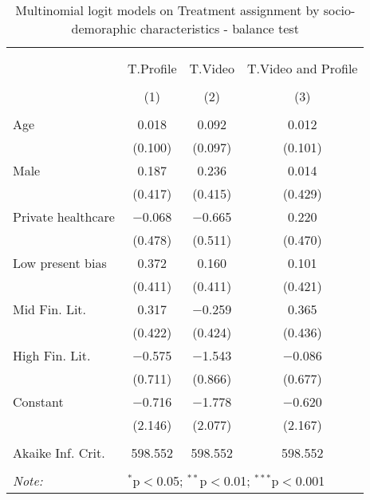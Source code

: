 
\begin{table}[H] \centering 
  \caption{Multinomial logit models on Treatment assignment by socio-demoraphic characteristics  - balance test} 
  \label{tbl:balance_lab} 
\begin{tabular}{@{\extracolsep{5pt}}lccc} 
\\[-1.8ex]\hline 
\hline \\[-1.8ex] 
\\[-1.8ex] & T.Profile & T.Video & T.Video and Profile \\ 
\\[-1.8ex] & (1) & (2) & (3)\\ 
\hline \\[-1.8ex] 
 Age & 0.018 & 0.092 & 0.012 \\ 
  & (0.100) & (0.097) & (0.101) \\ 
  Male & 0.187 & 0.236 & 0.014 \\ 
  & (0.417) & (0.415) & (0.429) \\ 
  Private healthcare & $-$0.068 & $-$0.665 & 0.220 \\ 
  & (0.478) & (0.511) & (0.470) \\ 
  Low present bias & 0.372 & 0.160 & 0.101 \\ 
  & (0.411) & (0.411) & (0.421) \\ 
  Mid Fin. Lit. & 0.317 & $-$0.259 & 0.365 \\ 
  & (0.422) & (0.424) & (0.436) \\ 
  High Fin. Lit. & $-$0.575 & $-$1.543 & $-$0.086 \\ 
  & (0.711) & (0.866) & (0.677) \\ 
  Constant & $-$0.716 & $-$1.778 & $-$0.620 \\ 
  & (2.146) & (2.077) & (2.167) \\ 
 \hline \\[-1.8ex] 
Akaike Inf. Crit. & 598.552 & 598.552 & 598.552 \\ 
\hline 
\hline \\[-1.8ex] 
\textit{Note:}  & \multicolumn{3}{l}{$^{*}$p$<$0.05; $^{**}$p$<$0.01; $^{***}$p$<$0.001} \\ 
\end{tabular} 
\end{table} 
